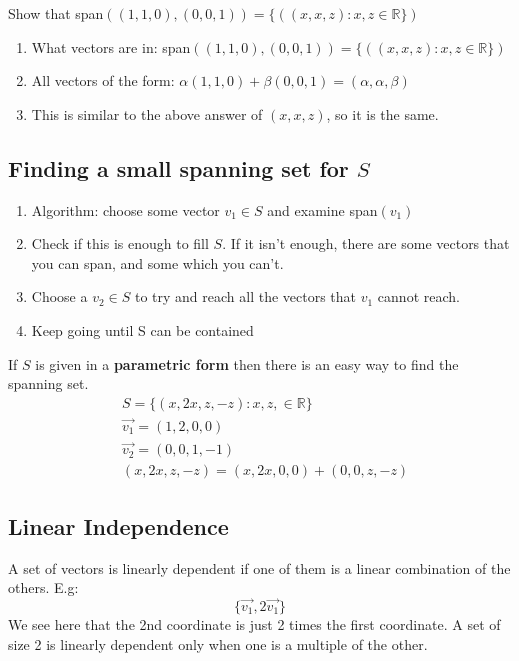 \documentclass[11pt]{book}
\begin{document}
{{	Show that span$\left(\left(1,1,0\right), \left(0,0,1\right)\right)=\lbrace(\left(x,x,z\right):x,z\in\mathbb{R}\rbrace)$
}
\begin{enumerate}
	\item{What vectors are in: span$\left( \left(1,1,0\right), \left(0,0,1\right)\right)=\lbrace( \left(x,x,z\right) :x,z\in\mathbb{R} \rbrace)$}
	\item{All vectors of the form: $\alpha\left(1,1,0\right)+\beta\left(0,0,1\right)=\left(\alpha,\alpha,\beta\right)$}
	\item{This is similar to the above answer of $\left(x,x,z\right)$, so it is the same.}
\end{enumerate}
\subsection{Finding a small spanning set for $S$}
\begin{enumerate}
	\item{Algorithm: choose some vector $v_{1}\in S$ and examine span$\left(v_{1}\right)$}
	\item{Check if this is enough to fill $S$. If it isn't enough, there are some vectors that you can span, and some which you can't.}	
	\item{Choose a $v_{2}\in S$ to try and reach all the vectors that $v_{1}$ cannot reach.}
	\item{Keep going until S can be contained}
\end{enumerate}
\par{If $S$ is given in a \textbf{parametric form} then there is an easy way to find the spanning set.}
\begin{align*}
	& S=\lbrace\left(x,2x,z,-z\right): x,z,\in \mathbb{R}\rbrace \\
	& \vec{v_{1}}=\left(1,2,0,0\right) \\
	& \vec{v_{2}}=\left(0,0,1,-1\right) \\
	& \left(x,2x,z,-z\right)=\left(x,2x,0,0\right)+\left(0,0,z,-z\right)
\end{align*}
\subsection{Linear Independence}
\par{A set of vectors is linearly dependent if one of them is a linear combination of the others. E.g: \[
\lbrace\vec{v_{1}}, 2\vec{v_{1}}\rbrace
\] We see here that the 2nd coordinate is just 2 times the first coordinate. A set of size 2 is linearly dependent only when one is a multiple of the other.}
}
\end{document}
